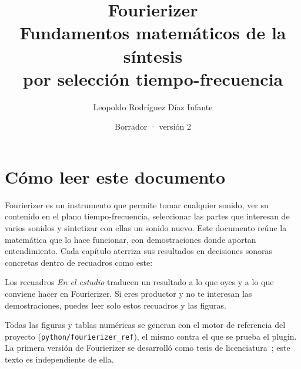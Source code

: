 \documentclass[11pt,openany]{book}
\title{\textbf{Fourierizer}\\[0.4em]\Large Fundamentos matemáticos de la síntesis\\ por selección tiempo-frecuencia}
\author{Leopoldo Rodríguez Díaz Infante}
\date{Borrador · versión 2}
\begin{document}
\frontmatter
\maketitle
\tableofcontents

\chapter*{Cómo leer este documento}
Fourierizer es un instrumento que permite tomar cualquier sonido, ver su contenido en el plano
tiempo-frecuencia, seleccionar las partes que interesan de varios sonidos y sintetizar con ellas un
sonido nuevo. Este documento reúne la matemática que lo hace funcionar, con demostraciones donde
aportan entendimiento. Cada capítulo aterriza sus resultados en decisiones sonoras concretas
dentro de recuadros como este:

\begin{estudio}
Los recuadros \emph{En el estudio} traducen un resultado a lo que oyes y a lo que conviene hacer
en Fourierizer. Si eres productor y no te interesan las demostraciones, puedes leer solo estos
recuadros y las figuras.
\end{estudio}

Todas las figuras y tablas numéricas se generan con el motor de referencia del proyecto
(\texttt{python/fourierizer\_ref}), el mismo contra el que se prueba el plugin. La primera versión
de Fourierizer se desarrolló como tesis de licenciatura~\cite{rodriguez2025}; este texto es
independiente de ella.

\mainmatter











\backmatter


\end{document}
